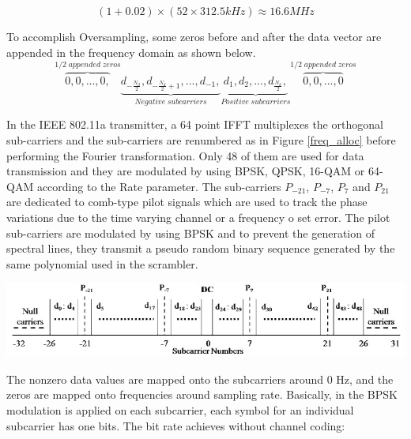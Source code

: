 \begin{equation} \label{occupied_bw}
(1+ 0.02)\times(52 \times 312.5kHz) \approx 16.6MHz
\end{equation}

To accomplish Oversampling, some zeros before and after the data vector are appended in the frequency domain as shown below.\\

\begin{equation} \label{over_sample}
\overbrace{0, 0, ... , 0,}^{1/2\;appended\;zeros}
\underbrace{d_{-\frac{N_d}{2}}, d_{-\frac{N_d}{2}+1}, ... , d_{-1},}_{Negative\;subcarriers}
\underbrace{d_{1}, d_{2}, ... , d_{\frac{N_d}{2}},}_{Positive\;subcarriers}
\overbrace{0, 0, ... , 0}^{1/2\;appended\;zeros}
\end{equation}

In the IEEE 802.11a transmitter, a 64 point IFFT multiplexes the orthogonal sub-carriers and the sub-carriers are renumbered as in Figure \ref{freq_alloc} before performing the Fourier transformation. Only 48 of them are used for data transmission and they are modulated by using BPSK, QPSK, 16-QAM or 64-QAM according to the Rate parameter. The sub-carriers $P_{-21}$, $P_{-7}$, $P_{7}$ and $P_{21}$ are dedicated to comb-type pilot signals which are used to track the phase variations due to the time varying channel or a frequency o set error. The pilot sub-carriers are modulated by using BPSK and to prevent the generation of spectral lines, they transmit a pseudo random binary sequence generated by the same polynomial used in the scrambler.\\

\begin{center}
\includegraphics[width=\textwidth]{content/fig/freq_alloc.JPG}
\label{freq_alloc}
\end{center}

The nonzero data values are mapped onto the subcarriers around 0 Hz, and the zeros are mapped onto frequencies around sampling rate.
Basically, in the BPSK modulation is applied on each subcarrier, each symbol for an individual subcarrier has one bits. The bit rate achieves without channel coding:\\

